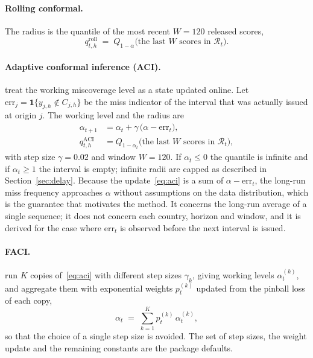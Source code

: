 \paragraph{Rolling conformal.} The radius is the quantile of the most recent $W=120$ released scores,
\begin{equation}\label{eq:rolling}
q^{\mathrm{roll}}_{t,h} \;=\; Q_{1-\alpha}\bigl(\text{the last } W \text{ scores in } \mathcal R_t\bigr).
\end{equation}

\paragraph{Adaptive conformal inference (ACI).} \citet{gibbs2021aci} treat the working miscoverage level as a state updated online. Let $\mathrm{err}_{j}=\mathbf 1\{y_{j,h}\notin C_{j,h}\}$ be the miss indicator of the interval that was actually issued at origin $j$. The working level and the radius are
\begin{align}
\alpha_{t+1} &= \alpha_t + \gamma\,\bigl(\alpha - \mathrm{err}_t\bigr), \label{eq:aci}\\
q^{\mathrm{ACI}}_{t,h} &= Q_{1-\alpha_t}\bigl(\text{the last } W \text{ scores in } \mathcal R_t\bigr), \label{eq:aciq}
\end{align}
with step size $\gamma=0.02$ and window $W=120$. If $\alpha_t\le 0$ the quantile is infinite and if $\alpha_t\ge 1$ the interval is empty; infinite radii are capped as described in Section~\ref{sec:delay}. Because the update~\eqref{eq:aci} is a sum of $\alpha-\mathrm{err}_t$, the long-run miss frequency approaches $\alpha$ without assumptions on the data distribution, which is the guarantee that motivates the method. It concerns the long-run average of a single sequence; it does not concern each country, horizon and window, and it is derived for the case where $\mathrm{err}_t$ is observed before the next interval is issued.

\paragraph{FACI.} \citet{gibbs2024faci} run $K$ copies of~\eqref{eq:aci} with different step sizes $\gamma_k$, giving working levels $\alpha^{(k)}_t$, and aggregate them with exponential weights $p^{(k)}_t$ updated from the pinball loss of each copy,
\begin{equation}\label{eq:faci}
\alpha_t \;=\; \sum_{k=1}^{K} p^{(k)}_t\,\alpha^{(k)}_t,
\end{equation}
so that the choice of a single step size is avoided. The set of step sizes, the weight update and the remaining constants are the package defaults.

